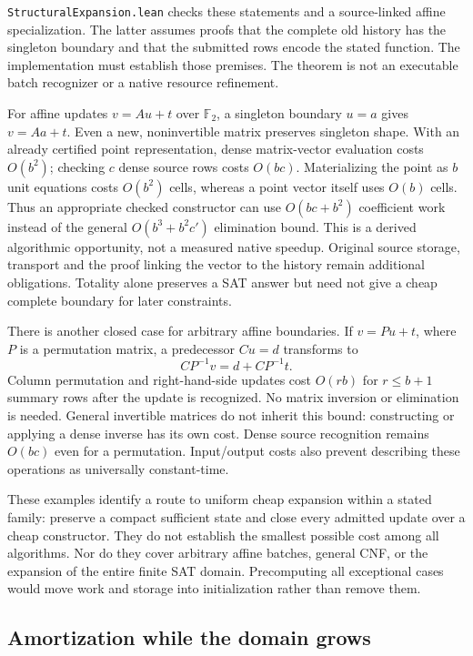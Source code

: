 \documentclass[11pt,a4paper]{article}
\numberwithin{equation}{section}
\theoremstyle{plain}
\theoremstyle{definition}
\theoremstyle{remark}
\begin{document}
\texttt{StructuralExpansion.lean} checks these statements and a source-linked affine specialization. The latter assumes proofs that the complete old history has the singleton boundary and that the submitted rows encode the stated function. The implementation must establish those premises. The theorem is not an executable batch recognizer or a native resource refinement.

For affine updates $v=Au+t$ over $\mathbb F_2$, a singleton boundary $u=a$ gives $v=Aa+t$. Even a new, noninvertible matrix preserves singleton shape. With an already certified point representation, dense matrix-vector evaluation costs $O(b^2)$; checking $c$ dense source rows costs $O(bc)$. Materializing the point as $b$ unit equations costs $O(b^2)$ cells, whereas a point vector itself uses $O(b)$ cells. Thus an appropriate checked constructor can use $O(bc+b^2)$ coefficient work instead of the general $O(b^3+b^2c')$ elimination bound. This is a derived algorithmic opportunity, not a measured native speedup. Original source storage, transport and the proof linking the vector to the history remain additional obligations. Totality alone preserves a SAT answer but need not give a cheap complete boundary for later constraints.

There is another closed case for arbitrary affine boundaries. If $v=Pu+t$, where $P$ is a permutation matrix, a predecessor $Cu=d$ transforms to
\[
CP^{-1}v=d+CP^{-1}t.
\]
Column permutation and right-hand-side updates cost $O(rb)$ for $r\leq b+1$ summary rows after the update is recognized. No matrix inversion or elimination is needed. General invertible matrices do not inherit this bound: constructing or applying a dense inverse has its own cost. Dense source recognition remains $O(bc)$ even for a permutation. Input/output costs also prevent describing these operations as universally constant-time.

These examples identify a route to uniform cheap expansion within a stated family: preserve a compact sufficient state and close every admitted update over a cheap constructor. They do not establish the smallest possible cost among all algorithms. Nor do they cover arbitrary affine batches, general CNF, or the expansion of the entire finite SAT domain. Precomputing all exceptional cases would move work and storage into initialization rather than remove them.

\subsection{Amortization while the domain grows}
\end{document}
